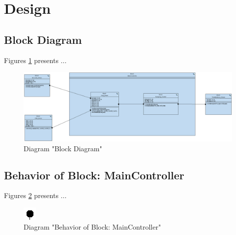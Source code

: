 \section{Design}
\subsection{Block Diagram}
Figures \ref{fig:Block DiagramBlock Diagram20} presents ...
\begin{figure}[htb]
\centering
\includegraphics[width=\textwidth]{img_2_0.png}
\caption{Diagram "Block Diagram"}
\label{fig:Block DiagramBlock Diagram20}
\end{figure}

\subsection{Behavior of Block: MainController}
Figures \ref{fig:MainControllerMainController21} presents ...
\begin{figure}[htb]
\centering
\includegraphics[width=\textwidth]{img_2_1.png}
\caption{Diagram "Behavior of Block: MainController"}
\label{fig:MainControllerMainController21}
\end{figure}

